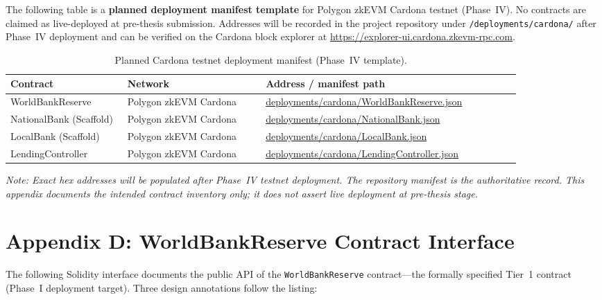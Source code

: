 \documentclass[12pt,a4paper]{report}
\newcommand{\tableheadcolor}{\rowcolor{TableHeadBg}}
\newcommand{\tableheadfont}{\bfseries}
\begin{document}
The following table is a \textbf{planned deployment manifest template} for Polygon zkEVM Cardona testnet (Phase~IV). No contracts are claimed as live-deployed at pre-thesis submission. Addresses will be recorded in the project repository under \texttt{/deployments/cardona/} after Phase~IV deployment and can be verified on the Cardona block explorer at \url{https://explorer-ui.cardona.zkevm-rpc.com}.

\begin{table}[H]
\centering
\caption[Planned Cardona testnet deployment manifest]{Planned Cardona testnet deployment manifest (Phase~IV template).}
\label{tab:cardona-manifest}
\begingroup
\footnotesize
\setlength{\tabcolsep}{4pt}
\renewcommand{\arraystretch}{1.15}
\begin{tabular}{@{}%
  >{\raggedright\arraybackslash}p{0.22\linewidth}%
  >{\raggedright\arraybackslash}p{0.26\linewidth}%
  >{\raggedright\arraybackslash}p{0.48\linewidth}@{}}
\toprule
\tableheadcolor
\tableheadfont Contract & \tableheadfont Network & \tableheadfont Address / manifest path \\
\midrule
WorldBankReserve & Polygon zkEVM Cardona & \url{deployments/cardona/WorldBankReserve.json} \\
\rowcolor{RowShade}
NationalBank (Scaffold) & Polygon zkEVM Cardona & \url{deployments/cardona/NationalBank.json} \\
LocalBank (Scaffold) & Polygon zkEVM Cardona & \url{deployments/cardona/LocalBank.json} \\
\rowcolor{RowShade}
LendingController & Polygon zkEVM Cardona & \url{deployments/cardona/LendingController.json} \\
\bottomrule
\end{tabular}
\endgroup
\end{table}

\noindent\textit{Note: Exact hex addresses will be populated after Phase~IV testnet deployment. The repository manifest is the authoritative record. This appendix documents the intended contract inventory only; it does not assert live deployment at pre-thesis stage.}


\chapter*{Appendix D: WorldBankReserve Contract Interface}
{}

The following Solidity interface documents the public API of the \texttt{WorldBankReserve} contract---the formally specified Tier~1 contract (Phase~I deployment target). Three design annotations follow the listing:
\end{document}
